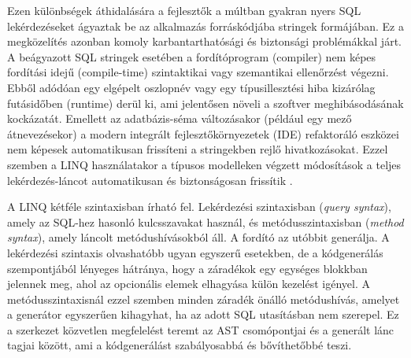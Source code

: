 Ezen különbségek áthidalására a fejlesztők a múltban gyakran nyers SQL lekérdezéseket ágyaztak be az alkalmazás forráskódjába stringek formájában. Ez a megközelítés azonban komoly karbantarthatósági és biztonsági problémákkal járt. A beágyazott SQL stringek esetében a fordítóprogram (compiler) nem képes fordítási idejű (compile-time) szintaktikai vagy szemantikai ellenőrzést végezni. Ebből adódóan egy elgépelt oszlopnév vagy egy típusillesztési hiba kizárólag futásidőben (runtime) derül ki, ami jelentősen növeli a szoftver meghibásodásának kockázatát. Emellett az adatbázis-séma változásakor (például egy mező átnevezésekor) a modern integrált fejlesztőkörnyezetek (IDE) refaktoráló eszközei nem képesek automatikusan frissíteni a stringekben rejlő hivatkozásokat. Ezzel szemben a LINQ használatakor a típusos modelleken végzett módosítások a teljes lekérdezés-láncot automatikusan és biztonságosan frissítik \cite{skeet2019csharp}.


A LINQ kétféle szintaxisban írható fel. Lekérdezési szintaxisban (\emph{query syntax}), amely az SQL-hez hasonló kulcsszavakat használ, és metódusszintaxisban (\emph{method syntax}), amely láncolt metódushívásokból áll. A fordító az utóbbit generálja. A lekérdezési szintaxis olvashatóbb ugyan egyszerű esetekben, de a kódgenerálás szempontjából lényeges hátránya, hogy a záradékok egy egységes blokkban jelennek meg, ahol az opcionális elemek elhagyása külön kezelést igényel. A metódusszintaxisnál ezzel szemben minden záradék önálló metódushívás, amelyet a generátor egyszerűen kihagyhat, ha az adott SQL utasításban nem szerepel. Ez a szerkezet közvetlen megfelelést teremt az AST csomópontjai és a generált lánc tagjai között, ami a kódgenerálást szabályosabbá és bővíthetőbbé teszi.

